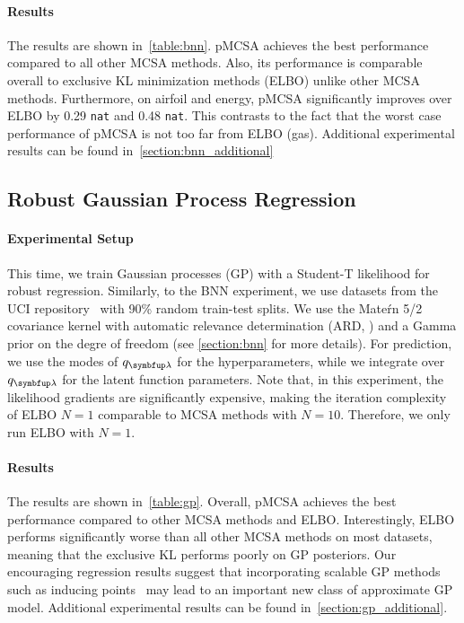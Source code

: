 \vspace{-0.1in}
\paragraph{Results}
The results are shown in~\cref{table:bnn}.
pMCSA achieves the best performance compared to all other MCSA methods.
Also, its performance is comparable overall to exclusive KL minimization methods (ELBO) unlike other MCSA methods.
Furthermore, on \textsf{airfoil} and \textsf{energy}, pMCSA significantly improves over ELBO by 0.29 \texttt{nat} and 0.48 \texttt{nat}.
This contrasts to the fact that the worst case performance of pMCSA is not too far from ELBO (\textsf{gas}).
Additional experimental results can be found in~\cref{section:bnn_additional}

  \vspace{-0.05in}
\subsection{Robust Gaussian Process Regression}\label{section:bgp}
  \vspace{-0.05in}
\paragraph{Experimental Setup}
This time, we train Gaussian processes (GP) with a Student-T likelihood for robust regression.
Similarly, to the BNN experiment, we use datasets from the UCI repository~\cite{Dua:2019} with 90\% random train-test splits.
We use the Mate\'rn 5/2 covariance kernel with automatic relevance determination (ARD, \citealt{neal_bayesian_1996}) and a Gamma prior on the degre of freedom (see \cref{section:bnn} for more details).
For prediction, we use the modes of \(q_{\vlambda}\) for the hyperparameters, while we integrate over \(q_{\vlambda}\) for the latent function parameters.
Note that, in this experiment, the likelihood gradients are significantly expensive, making the iteration complexity of ELBO \(N=1\) comparable to MCSA methods with \(N=10\).
Therefore, we only run ELBO with \(N=1\).

\vspace{-0.1in}
\paragraph{Results}
The results are shown in~\cref{table:gp}.
Overall, pMCSA achieves the best performance compared to other MCSA methods and ELBO.
Interestingly, ELBO performs significantly worse than all other MCSA methods on most datasets, meaning that the exclusive KL performs poorly on GP posteriors.
Our encouraging regression results suggest that incorporating scalable GP methods such as inducing points~\citep{NIPS2005_4491777b} may lead to an important new class of approximate GP model.
Additional experimental results can be found in~\cref{section:gp_additional}.

